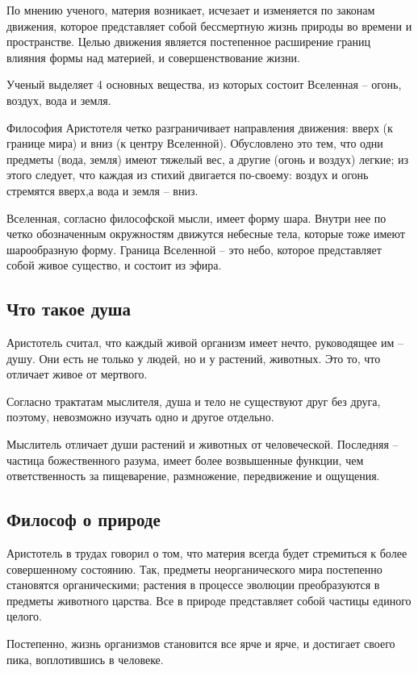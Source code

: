 \documentclass[a4paper, 14pt]{extreport}
\begin{document}
По мнению ученого, материя возникает, исчезает и изменяется по законам
движения, которое представляет собой бессмертную жизнь природы во
времени и пространстве. Целью движения является постепенное расширение
границ влияния формы над материей, и совершенствование жизни.

Ученый выделяет 4 основных вещества, из которых состоит Вселенная --
огонь, воздух, вода и земля.

Философия Аристотеля четко разграничивает направления движения: вверх (к
границе мира) и вниз (к центру Вселенной). Обусловлено это тем, что одни
предметы (вода, земля) имеют тяжелый вес, а другие (огонь и воздух)
легкие; из этого следует, что каждая из стихий двигается по-своему:
воздух и огонь стремятся вверх,а вода и земля -- вниз.

Вселенная, согласно философской мысли, имеет форму шара. Внутри нее по
четко обозначенным окружностям движутся небесные тела, которые тоже
имеют шарообразную форму. Граница Вселенной -- это небо, которое
представляет собой живое существо, и состоит из эфира.

\subsection{Что такое душа}

Аристотель считал, что каждый живой организм имеет нечто, руководящее им
-- душу. Они есть не только у людей, но и у растений, животных. Это то,
что отличает живое от мертвого.

Согласно трактатам мыслителя, душа и тело не существуют друг без друга,
поэтому, невозможно изучать одно и другое отдельно.

Мыслитель отличает души растений и животных от человеческой. Последняя
-- частица божественного разума, имеет более возвышенные функции, чем
ответственность за пищеварение, размножение, передвижение и ощущения.

\subsection{Философ о природе}

Аристотель в трудах говорил о том, что материя всегда будет стремиться к
более совершенному состоянию. Так, предметы неорганического мира
постепенно становятся органическими; растения в процессе эволюции
преобразуются в предметы животного царства. Все в природе представляет
собой частицы единого целого.

Постепенно, жизнь организмов становится все ярче и ярче, и достигает
своего пика, воплотившись в человеке.
\end{document}
